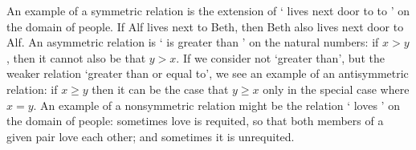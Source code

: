  An example of a symmetric relation is the extension of ` lives next door to to ' on the domain of people. If Alf lives next to Beth, then Beth also lives next door to Alf. An asymmetric relation is ` is greater than ' on the natural numbers: if $x>y$, then it cannot also be that $y > x$. If we consider not `greater than', but the weaker relation `greater than or equal to', we see an example of an antisymmetric relation: if $x≥y$ then it can be the case that $y≥x$ only in the special case where $x=y$. An example of a nonsymmetric relation might be the relation ` loves ' on the domain of people: sometimes love is requited, so that both members of a given pair love each other; and sometimes it is unrequited.

